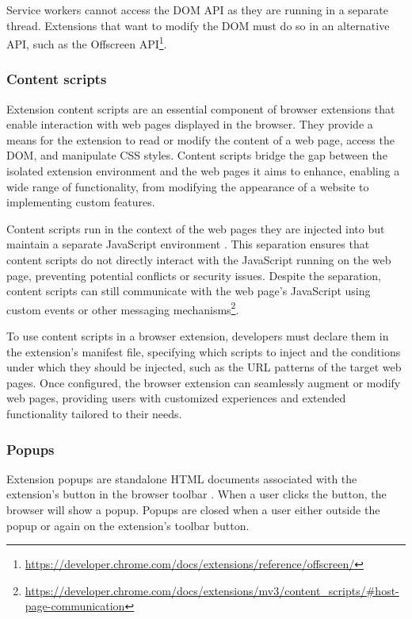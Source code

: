 Service workers cannot access the DOM API as they are running in a separate thread. Extensions that want to modify the DOM must do so in an alternative API, such as the Offscreen API\footnote{\url{https://developer.chrome.com/docs/extensions/reference/offscreen/}}.

\subsubsection{Content scripts}

Extension content scripts are an essential component of browser extensions that enable interaction with web pages displayed in the browser. They provide a means for the extension to read or modify the content of a web page, access the DOM, and manipulate CSS styles. Content scripts bridge the gap between the isolated extension environment and the web pages it aims to enhance, enabling a wide range of functionality, from modifying the appearance of a website to implementing custom features.

Content scripts run in the context of the web pages they are injected into but maintain a separate JavaScript environment \cite{ChromeWebExtensions}. This separation ensures that content scripts do not directly interact with the JavaScript running on the web page, preventing potential conflicts or security issues. Despite the separation, content scripts can still communicate with the web page's JavaScript using custom events or other messaging mechanisms\footnote{\url{https://developer.chrome.com/docs/extensions/mv3/content_scripts/\#host-page-communication}}.

To use content scripts in a browser extension, developers must declare them in the extension's manifest file, specifying which scripts to inject and the conditions under which they should be injected, such as the URL patterns of the target web pages. Once configured, the browser extension can seamlessly augment or modify web pages, providing users with customized experiences and extended functionality tailored to their needs.

\subsubsection{Popups}

Extension popups are standalone HTML documents associated with the extension's button in the browser toolbar \cite{ChromeWebExtensions}. When a user clicks the button, the browser will show a popup. Popups are closed when a user either outside the popup or again on the extension's toolbar button.

